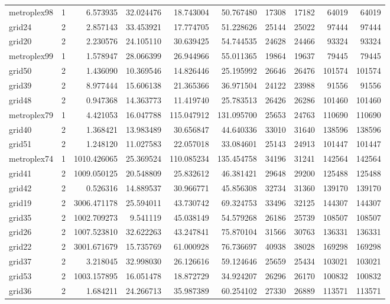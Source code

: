 \begin{longtable}{|l|r|r|r|r|r|r|r|r|r|}
metroplex98 & 1 & 6.573935 & 32.024476 & 18.743004 & 50.767480 & 17308 & 17182 & 64019 & 64019 \\
grid24 & 2 & 2.857143 & 33.453921 & 17.774705 & 51.228626 & 25144 & 25022 & 97444 & 97444 \\
grid20 & 2 & 2.230576 & 24.105110 & 30.639425 & 54.744535 & 24628 & 24466 & 93324 & 93324 \\
metroplex99 & 1 & 1.578947 & 28.066399 & 26.944966 & 55.011365 & 19864 & 19637 & 79445 & 79445 \\
grid50 & 2 & 1.436090 & 10.369546 & 14.826446 & 25.195992 & 26646 & 26476 & 101574 & 101574 \\
grid39 & 2 & 8.977444 & 15.606138 & 21.365366 & 36.971504 & 24122 & 23988 & 91556 & 91556 \\
grid48 & 2 & 0.947368 & 14.363773 & 11.419740 & 25.783513 & 26426 & 26286 & 101460 & 101460 \\
metroplex79 & 1 & 4.421053 & 16.047788 & 115.047912 & 131.095700 & 25653 & 24763 & 110690 & 110690 \\
grid40 & 2 & 1.368421 & 13.983489 & 30.656847 & 44.640336 & 33010 & 31640 & 138596 & 138596 \\
grid51 & 2 & 1.248120 & 11.027583 & 22.057018 & 33.084601 & 25143 & 24913 & 101447 & 101447 \\
metroplex74 & 1 & 1010.426065 & 25.369524 & 110.085234 & 135.454758 & 34196 & 31241 & 142564 & 142564 \\
grid41 & 2 & 1009.050125 & 20.548809 & 25.832612 & 46.381421 & 29648 & 29200 & 125488 & 125488 \\
grid42 & 2 & 0.526316 & 14.889537 & 30.966771 & 45.856308 & 32734 & 31360 & 139170 & 139170 \\
grid19 & 2 & 3006.471178 & 25.594011 & 43.730742 & 69.324753 & 33496 & 32125 & 144307 & 144307 \\
grid35 & 2 & 1002.709273 & 9.541119 & 45.038149 & 54.579268 & 26186 & 25739 & 108507 & 108507 \\
grid26 & 2 & 1007.523810 & 32.622263 & 43.247841 & 75.870104 & 31566 & 30763 & 136331 & 136331 \\
grid22 & 2 & 3001.671679 & 15.735769 & 61.000928 & 76.736697 & 40938 & 38028 & 169298 & 169298 \\
grid37 & 2 & 3.218045 & 32.998030 & 26.126616 & 59.124646 & 25659 & 25434 & 103021 & 103021 \\
grid53 & 2 & 1003.157895 & 16.051478 & 18.872729 & 34.924207 & 26296 & 26170 & 100832 & 100832 \\
grid36 & 2 & 1.684211 & 24.266713 & 35.987389 & 60.254102 & 27330 & 26889 & 113571 & 113571 \\

\end{longtable}

